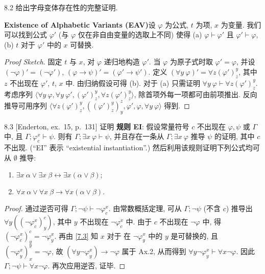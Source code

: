 \begin{exercise}{8.2}
  给出字母变体存在性的完整证明.
\end{exercise}

\textbf{Existence of Alphabetic Variants (EAV)}\quad 设 $\varphi$ 为公式, $t$ 为项, $x$ 为变量. 我们可以找到公式 $\varphi'$ (与 $\varphi$ 仅在非自由变量的选取上不同) 使得 (a) $\varphi\vdash \varphi'$ 且 $\varphi'\vdash \varphi$, (b) $t$ 对于 $\varphi'$ 中的 $x$ 可替换.

\begin{proof}[Proof Sketch]
  固定 $t$ 与 $x$, 对 $\varphi$ 递归地构造 $\varphi'$. 当 $\varphi$ 为原子式时取 $\varphi'=\varphi$, 并设 $(\neg \varphi)'=(\neg \varphi')$, $(\varphi\rightarrow \psi)'=(\varphi'\rightarrow \psi')$. 定义 $(\forall y\ \varphi)'=\forall z(\varphi')_z^y$, 其中 $z$ 不出现在 $\varphi'$, $t$, $x$ 中. 由归纳假设可得 (b). 对于 (a) 只需证明 $\forall y\ \varphi\vdash\forall z(\varphi')_z^y$. 考虑序列 $\langle \forall y\ \varphi, \forall y\ \varphi', (\varphi')_z^y, \forall z(\varphi')_z^y\rangle$, 除首项外每一项都可由前项推出. 反向推导可用序列 $\langle\forall z(\varphi')_z^y, ((\varphi')_z^y)_y^z, \varphi',\varphi,\forall y\ \varphi\rangle$ 得到.
\end{proof}

\begin{exercise}{8.3}
  [Enderton, ex.~15, p.~131] 证明 \textbf{规则 EI}: 假设常量符号 $c$ 不出现在 $\varphi,\psi$ 或 $\Gamma$ 中, 且 $\Gamma;\varphi_c^x\vdash \psi$. 则有 $\Gamma;\exists x\ \varphi\vdash \psi$, 并且存在一条从 $\Gamma;\exists x\ \varphi$ 推导 $\psi$ 的证明, 其中 $c$ 不出现. (``EI'' 表示 ``existential instantiation''.) 然后利用该规则证明下列公式均可从 $\emptyset$ 推导:
  \begin{enumerate}
    \item $\exists x\ \alpha\vee\exists x\ \beta \leftrightarrow \exists x(\alpha\vee \beta);$
    \item $\forall x\ \alpha\vee\forall x\ \beta \rightarrow \forall x(\alpha\vee \beta).$\qedhere
  \end{enumerate}
\end{exercise}

\begin{proof}
  通过逆否可得 $\Gamma;\neg \psi\vdash\neg \varphi_c^x$. 由常数概括定理, 可从 $\Gamma;\neg \psi$ (不含 $c$) 推导出 $\forall y((\neg \varphi_c^x)_y^c)$, 其中 $y$ 不出现在 $\neg\varphi_c^x$ 中. 由于 $c$ 不出现在 $\neg\varphi$ 中, 得 $(\neg\varphi_c^x)_y^c=\neg\varphi_y^x$. 再由 \ref{7.3} 知 $x$ 对于 在 $\neg \varphi_y^x$ 中的 $y$ 是可替换的, 且 $(\neg \varphi_y^x)_x^y=\neg \varphi$, 故 $(\forall y \neg\varphi_y^x)\to \neg\varphi$ 属于 Ax.2, 从而得到 $\forall y\neg \varphi_y^x\vdash\forall x\neg \varphi$. 因此 $\Gamma;\neg \psi\vdash\forall x\neg \varphi$. 再次应用逆否, 证毕.
\end{proof}

